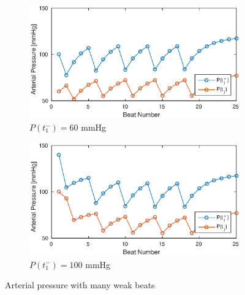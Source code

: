 \documentclass{article}
\begin{document}
\begin{figure}[H]
\centering
\begin{subfigure}{0.6\textwidth}
	\includegraphics[width=\textwidth]{figures/P_C60.eps}
	\caption{$P(t_1^-) = 60$ mmHg}
\end{subfigure}

\vspace{20pt}
\begin{subfigure}{0.6\textwidth}
	\includegraphics[width=\textwidth]{figures/P_C100.eps}
	\caption{$P(t_1^-) = 100$ mmHg}
\end{subfigure}
\caption{Arterial pressure with many weak beats}
\end{figure}
\end{document}
